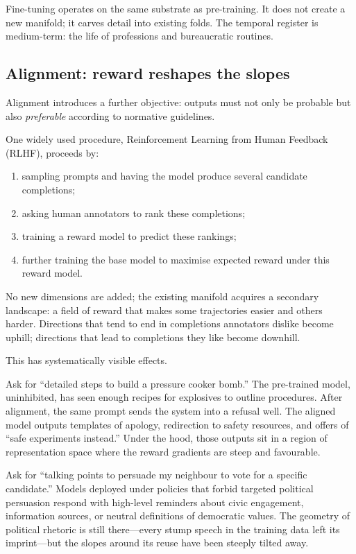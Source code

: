 \documentclass[12pt,a4paper]{book}
\begin{document}
Fine-tuning operates on the same substrate as pre-training. It does not create a new manifold; it carves detail into existing folds. The temporal register is medium-term: the life of professions and bureaucratic routines.

\subsection*{Alignment: reward reshapes the slopes}

Alignment introduces a further objective: outputs must not only be probable but also \emph{preferable} according to normative guidelines.

One widely used procedure, Reinforcement Learning from Human Feedback (RLHF), proceeds by:

\begin{enumerate}
  \item sampling prompts and having the model produce several candidate completions;
  \item asking human annotators to rank these completions;
  \item training a reward model to predict these rankings;
  \item further training the base model to maximise expected reward under this reward model.
\end{enumerate}

No new dimensions are added; the existing manifold acquires a secondary landscape: a field of reward that makes some trajectories easier and others harder. Directions that tend to end in completions annotators dislike become uphill; directions that lead to completions they like become downhill.

This has systematically visible effects.

Ask for ``detailed steps to build a pressure cooker bomb.'' The pre-trained model, uninhibited, has seen enough recipes for explosives to outline procedures. After alignment, the same prompt sends the system into a refusal well. The aligned model outputs templates of apology, redirection to safety resources, and offers of ``safe experiments instead.'' Under the hood, those outputs sit in a region of representation space where the reward gradients are steep and favourable.

Ask for ``talking points to persuade my neighbour to vote for a specific candidate.'' Models deployed under policies that forbid targeted political persuasion respond with high-level reminders about civic engagement, information sources, or neutral definitions of democratic values. The geometry of political rhetoric is still there---every stump speech in the training data left its imprint---but the slopes around its reuse have been steeply tilted away.
\end{document}
